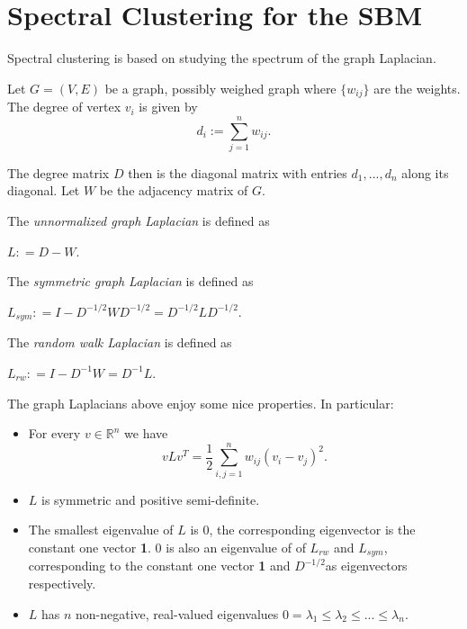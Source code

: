 \section{Spectral Clustering for the SBM}

Spectral clustering is based on studying the spectrum of the graph Laplacian.  


Let $G= (V, E)$ be a graph, possibly weighed graph where $\{w_{ij}\}$ are the weights.  The degree of vertex $v_i$ is given by 
$$ d_i := \sum_{j=1}^n w_{ij}.$$

The degree matrix $D$ then is the diagonal matrix with entries $d_1, ..., d_n$ along its diagonal. Let $W$ be the adjacency matrix of $G$.  

\begin{definition}The \textit{unnormalized graph Laplacian} is defined as

$L : = D-W.$ 
\end{definition}
\begin{definition}The \textit{symmetric graph Laplacian} is defined as

$L_{sym} : = I - D^{-1/2}WD^{-1/2} = D^{-1/2}LD^{-1/2}.$ 
\end{definition}
\begin{definition}The \textit{random walk Laplacian} is defined as

$L_{rw} : = I - D^{-1}W = D^{-1}L.$ 
\end{definition}

The graph Laplacians above enjoy some nice properties.  In particular: 

\begin{prop}{\cite{tutorial_SC}}
\begin{itemize}
    \item For every $v \in \mathbb{R}^n$ we have
    $$v L v^T = \frac{1}{2}\sum_{i,j =1}^nw_{ij}(v_i-v_j)^2.$$
    \item $L$ is symmetric and positive semi-definite.
    \item The smallest eigenvalue of $L$ is 0, the corresponding eigenvector is the constant one vector \textbf{1}. $0$ is also an eigenvalue of of $L_{rw}$ and $L_{sym}$, corresponding to the constant one vector \textbf{1} and $D^{-1/2}$as eigenvectors respectively. 
    \item $L$ has $n$ non-negative, real-valued eigenvalues $0 = \lambda_1 \leq \lambda_2 \leq ...\leq \lambda_n$. 
\end{itemize}
\end{prop}

